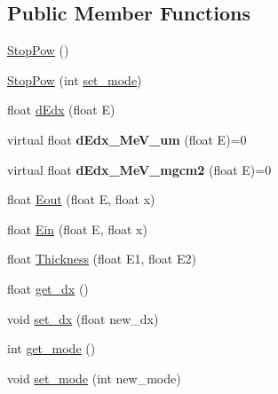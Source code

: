 \subsection*{Public Member Functions}
\begin{DoxyCompactItemize}
\item 
\hyperlink{class_stop_pow_a88b4c0960945e9dc1fe1fb1a2ece570e}{Stop\-Pow} ()
\item 
\hyperlink{class_stop_pow_a1971305d76835a5e1dde6b541a80a4a5}{Stop\-Pow} (int \hyperlink{class_stop_pow_a09a136f848fb5d5d37f1147fe7b86652}{set\-\_\-mode})
\item 
float \hyperlink{class_stop_pow_abd6b764cf660361976973410d1c74d96}{d\-Edx} (float E)
\item 
\hypertarget{class_stop_pow_ae81a89457b3c415c7cf06758b2e67dd5}{virtual float {\bfseries d\-Edx\-\_\-\-Me\-V\-\_\-um} (float E)=0}\label{class_stop_pow_ae81a89457b3c415c7cf06758b2e67dd5}

\item 
\hypertarget{class_stop_pow_a62611d41eca22419c9ce1785528f5826}{virtual float {\bfseries d\-Edx\-\_\-\-Me\-V\-\_\-mgcm2} (float E)=0}\label{class_stop_pow_a62611d41eca22419c9ce1785528f5826}

\item 
float \hyperlink{class_stop_pow_af879d2ece5a5a4ba8ca482cfc77693bb}{Eout} (float E, float x)
\item 
float \hyperlink{class_stop_pow_ab5215133a69c6a0fcce35e01cd9ea960}{Ein} (float E, float x)
\item 
float \hyperlink{class_stop_pow_ae9f34d3cb7a51885ac4a772b79e13cb7}{Thickness} (float E1, float E2)
\item 
float \hyperlink{class_stop_pow_a4b0a7fe76ea8d54e84d670997d52a5d6}{get\-\_\-dx} ()
\item 
void \hyperlink{class_stop_pow_a2a9db61854e43b46efd8613923702efd}{set\-\_\-dx} (float new\-\_\-dx)
\item 
int \hyperlink{class_stop_pow_ab056d4cd23c54f112b18fd3a6bb10bcf}{get\-\_\-mode} ()
\item 
void \hyperlink{class_stop_pow_a09a136f848fb5d5d37f1147fe7b86652}{set\-\_\-mode} (int new\-\_\-mode)
\end{DoxyCompactItemize}
